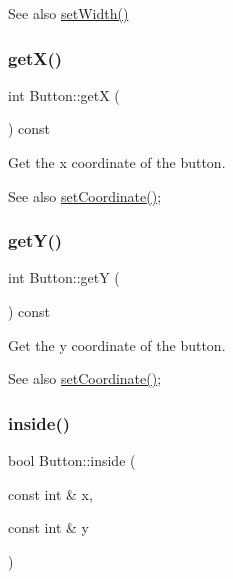 \begin{DoxySeeAlso}{See also}
\mbox{\hyperlink{class_button_a77d90f51ba19a275e9d662cbb081049f}{set\+Width()}} 
\end{DoxySeeAlso}
\mbox{\label{class_button_a05c6aae1cf037ad66e3821963fe72988}} 
\subsubsection{\texorpdfstring{get\+X()}{getX()}}
{\footnotesize\ttfamily int Button\+::getX (\begin{DoxyParamCaption}{ }\end{DoxyParamCaption}) const\hspace{0.3cm}{\ttfamily [virtual]}}



Get the x coordinate of the button. 

\begin{DoxySeeAlso}{See also}
\mbox{\hyperlink{class_button_a808e7d56490172fdeab84afb01fc4bde}{set\+Coordinate()}}; 
\end{DoxySeeAlso}
\mbox{\label{class_button_a3acf216100c43b999e38047bfdf99ee7}} 
\subsubsection{\texorpdfstring{get\+Y()}{getY()}}
{\footnotesize\ttfamily int Button\+::getY (\begin{DoxyParamCaption}{ }\end{DoxyParamCaption}) const\hspace{0.3cm}{\ttfamily [virtual]}}



Get the y coordinate of the button. 

\begin{DoxySeeAlso}{See also}
\mbox{\hyperlink{class_button_a808e7d56490172fdeab84afb01fc4bde}{set\+Coordinate()}}; 
\end{DoxySeeAlso}
\mbox{\label{class_button_ac2449ee251bb58bb505b3b6c825d4129}} 
\subsubsection{\texorpdfstring{inside()}{inside()}}
{\footnotesize\ttfamily bool Button\+::inside (\begin{DoxyParamCaption}\item[{const int \&}]{x,  }\item[{const int \&}]{y }\end{DoxyParamCaption})\hspace{0.3cm}{\ttfamily [virtual]}}



